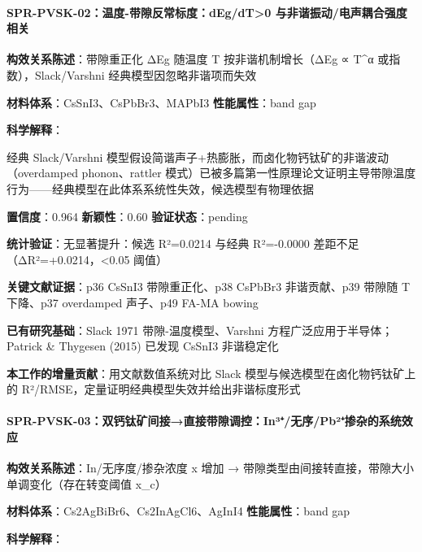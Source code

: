 \documentclass[12pt,a4paper]{ctexart}
\begin{document}
\paragraph{SPR-PVSK-02：温度-带隙反常标度：dEg/dT\textgreater0 与非谐振动/电声耦合强度相关}\label{spr-pvsk-02ux6e29ux5ea6-ux5e26ux9699ux53cdux5e38ux6807ux5ea6degdt0-ux4e0eux975eux8c10ux632fux52a8ux7535ux58f0ux8026ux5408ux5f3aux5ea6ux76f8ux5173}

\textbf{构效关系陈述}：带隙重正化 ΔEg 随温度 T 按非谐机制增长（ΔEg ∝ T\^{}α 或指数），Slack/Varshni 经典模型因忽略非谐项而失效

\textbf{材料体系}：CsSnI3、CsPbBr3、MAPbI3 \textbar{} \textbf{性能属性}：band gap

\textbf{科学解释}：

经典 Slack/Varshni 模型假设简谐声子+热膨胀，而卤化物钙钛矿的非谐波动（overdamped phonon、rattler 模式）已被多篇第一性原理论文证明主导带隙温度行为------经典模型在此体系系统性失效，候选模型有物理依据

\textbf{置信度}：0.964 \textbar{} \textbf{新颖性}：0.60 \textbar{} \textbf{验证状态}：pending

\textbf{统计验证}：无显著提升：候选 R²=0.0214 与经典 R²=-0.0000 差距不足（ΔR²=+0.0214，\textless0.05 阈值）

\textbf{关键文献证据}：p36 CsSnI3 带隙重正化、p38 CsPbBr3 非谐贡献、p39 带隙随 T 下降、p37 overdamped 声子、p49 FA-MA bowing

\textbf{已有研究基础}：Slack 1971 带隙-温度模型、Varshni 方程广泛应用于半导体；Patrick \& Thygesen (2015) 已发现 CsSnI3 非谐稳定化

\textbf{本工作的增量贡献}：用文献数值系统对比 Slack 模型与候选模型在卤化物钙钛矿上的 R²/RMSE，定量证明经典模型失效并给出非谐标度形式

\paragraph{SPR-PVSK-03：双钙钛矿间接→直接带隙调控：In³⁺/无序/Pb²⁺掺杂的系统效应}\label{spr-pvsk-03ux53ccux9499ux949bux77ffux95f4ux63a5ux76f4ux63a5ux5e26ux9699ux8c03ux63a7inuxb3ux65e0ux5e8fpbuxb2ux63baux6742ux7684ux7cfbux7edfux6548ux5e94}

\textbf{构效关系陈述}：In/无序度/掺杂浓度 x 增加 → 带隙类型由间接转直接，带隙大小单调变化（存在转变阈值 x\_c）

\textbf{材料体系}：Cs2AgBiBr6、Cs2InAgCl6、AgInI4 \textbar{} \textbf{性能属性}：band gap

\textbf{科学解释}：
\end{document}
